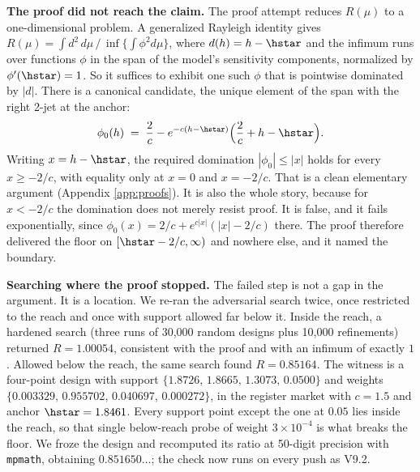 \documentclass{article}
\begin{document}
\textbf{The proof did not reach the claim.} The proof attempt reduces
$R(\mu)$ to a one-dimensional problem. A generalized Rayleigh identity gives
$R(\mu) = \int d^2\, d\mu \,/\, \inf\{\int \phi^2 d\mu\}$, where $d(h) = h -
\hstar$ and the infimum runs over functions $\phi$ in the span of the model's
sensitivity components, normalized by $\phi'(\hstar) = 1$. So it suffices to
exhibit one such $\phi$ that is pointwise dominated by $|d|$. There is a
canonical candidate, the unique element of the span with the right 2-jet at
the anchor:
\[
\phi_0(h) \;=\; \frac{2}{c} - e^{-c(h-\hstar)}\Big(\frac{2}{c} + h - \hstar\Big).
\]
Writing $x = h - \hstar$, the required domination $|\phi_0| \le |x|$ holds for
every $x \ge -2/c$, with equality only at $x = 0$ and $x = -2/c$. That is a
clean elementary argument (Appendix \ref{app:proofs}). It is also the whole
story, because for $x < -2/c$ the domination does not merely resist proof. It
is false, and it fails exponentially, since $\phi_0(x) = 2/c +
e^{c|x|}(|x| - 2/c)$ there. The proof therefore delivered the floor on
$[\hstar - 2/c, \infty)$ and nowhere else, and it named the boundary.

\textbf{Searching where the proof stopped.} The failed step is not a gap in
the argument. It is a location. We re-ran the adversarial search twice, once
restricted to the reach and once with support allowed far below it. Inside
the reach, a hardened search (three runs of 30,000 random designs plus
10,000 refinements) returned $R = 1.00054$, consistent with the proof and
with an infimum of exactly $1$. Allowed below the reach, the same search
found $R = 0.85164$. The witness is a four-point design with support
$\{1.8726,\, 1.8665,\, 1.3073,\, 0.0500\}$ and weights
$\{0.003329,\, 0.955702,\, 0.040697,\, 0.000272\}$, in the register market
with $c = 1.5$ and anchor $\hstar = 1.8461$. Every support point except the
one at $0.05$ lies inside the reach, so that single below-reach probe of
weight $3\times 10^{-4}$ is what breaks the floor. We froze the design and
recomputed its ratio at 50-digit precision with \texttt{mpmath}, obtaining
$0.851650\ldots$; the check now runs on every push as V9.2.
\end{document}
